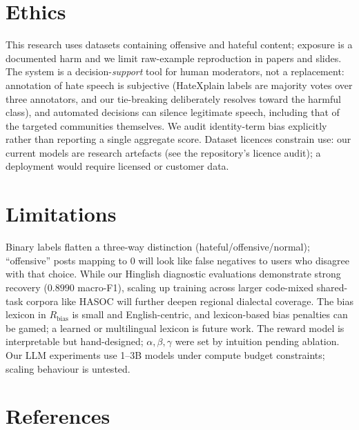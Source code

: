 \documentclass[11pt]{article}
\begin{document}
\section{Ethics}
This research uses datasets containing offensive and hateful content;
exposure is a documented harm and we limit raw-example reproduction in
papers and slides. The system is a decision-\emph{support} tool for human
moderators, not a replacement: annotation of hate speech is subjective
(HateXplain labels are majority votes over three annotators, and our
tie-breaking deliberately resolves toward the harmful class), and automated
decisions can silence legitimate speech, including that of the targeted
communities themselves. We audit identity-term bias explicitly rather than
reporting a single aggregate score. Dataset licences constrain use: our
current models are research artefacts (see the repository's licence
audit); a deployment would require licensed or customer data.

\section{Limitations}
Binary labels flatten a three-way distinction (hateful/offensive/normal);
``offensive'' posts mapping to 0 will look like false negatives to users
who disagree with that choice. While our Hinglish diagnostic evaluations demonstrate strong recovery ($0.8990$ macro-F1), scaling up training across larger code-mixed shared-task corpora like HASOC will further deepen regional dialectal coverage. The bias lexicon in $R_{\text{bias}}$ is small and
English-centric, and lexicon-based bias penalties can be gamed; a learned
or multilingual lexicon is future work. The reward model is
interpretable but hand-designed; $\alpha,\beta,\gamma$ were set by intuition
pending ablation. Our LLM experiments use 1--3B models under compute
budget constraints; scaling behaviour is untested.

\section*{References}

\end{document}
